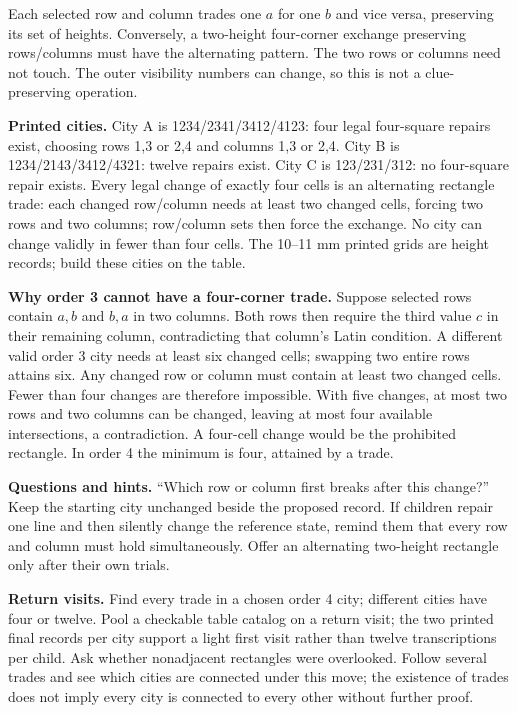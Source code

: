 Each selected row and column trades one $a $ for one $b $ and vice versa, preserving its set of heights. Conversely, a two-height four-corner exchange preserving rows/columns must have the alternating pattern. The two rows or columns need not touch. The outer visibility numbers can change, so this is not a clue-preserving operation.

\textbf{Printed cities.} City A is 1234/2341/3412/4123: four legal four-square repairs exist, choosing rows 1,3 or 2,4 and columns 1,3 or 2,4. City B is 1234/2143/3412/4321: twelve repairs exist. City C is 123/231/312: no four-square repair exists. Every legal change of exactly four cells is an alternating rectangle trade: each changed row/column needs at least two changed cells, forcing two rows and two columns; row/column sets then force the exchange. No city can change validly in fewer than four cells. The 10--11 mm printed grids are height records; build these cities on the table.

\textbf{Why order 3 cannot have a four-corner trade.} Suppose selected rows contain $a,b $ and $b,a $ in two columns. Both rows then require the third value $c $ in their remaining column, contradicting that column's Latin condition. A different valid order 3 city needs at least six changed cells; swapping two entire rows attains six. Any changed row or column must contain at least two changed cells. Fewer than four changes are therefore impossible. With five changes, at most two rows and two columns can be changed, leaving at most four available intersections, a contradiction. A four-cell change would be the prohibited rectangle. In order 4 the minimum is four, attained by a trade.

\textbf{Questions and hints.} ``Which row or column first breaks after this change?'' Keep the starting city unchanged beside the proposed record. If children repair one line and then silently change the reference state, remind them that every row and column must hold simultaneously. Offer an alternating two-height rectangle only after their own trials.

\textbf{Return visits.} Find every trade in a chosen order 4 city; different cities have four or twelve. Pool a checkable table catalog on a return visit; the two printed final records per city support a light first visit rather than twelve transcriptions per child. Ask whether nonadjacent rectangles were overlooked. Follow several trades and see which cities are connected under this move; the existence of trades does not imply every city is connected to every other without further proof.

